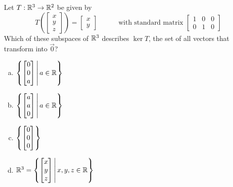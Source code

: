 \begin{activity}{5}
Let $T: \mathbb{R}^3 \rightarrow \mathbb{R}^2$ be given by
\[
  T\left(\begin{bmatrix}x \\ y\\z \end{bmatrix} \right)
    =
  \begin{bmatrix} x \\ y \end{bmatrix}
    \hspace{3em}
    \text{with standard matrix }
  \begin{bmatrix} 1 & 0 & 0 \\ 0 & 1 & 0 \end{bmatrix}
\]
Which of these subspaces of \(\mathbb{R}^3\) describes \(\ker T\),
the set of all vectors that transform into \(\vec 0\)?
\begin{multicols}{2}
\begin{enumerate}[a)]
\item \(\left\{\begin{bmatrix}0 \\ 0\\ a\end{bmatrix}\,\middle|\,a\in\mathbb{R}\right\}\)
\item \(\left\{\begin{bmatrix}a \\ a\\ 0\end{bmatrix}\,\middle|\,a\in\mathbb{R}\right\}\)
\item \(\left\{\begin{bmatrix}0\\0\\0\end{bmatrix}\right\}\)
\item \(\mathbb{R}^3=\left\{\begin{bmatrix}x \\ y\\z\end{bmatrix}\,\middle|\,x,y,z\in\mathbb{R}\right\}\)
\end{enumerate}
\end{multicols}
\end{activity}

